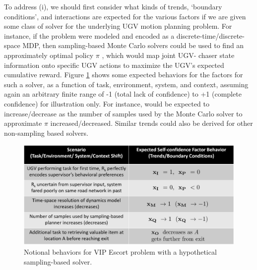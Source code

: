 To address (i), we should first consider what kinds of trends, `boundary conditions', and interactions are expected for the various factors if we are given some class of solver for the underlying UGV motion planning problem. For instance, if the problem were modeled and encoded as a discrete-time/discrete-space MDP, then sampling-based Monte Carlo solvers could be used to find an approximately optimal policy $\pi$ \cite{Browne2012-lj}, which would map joint UGV- chaser state information onto specific UGV actions to maximize the UGV's expected cumulative reward. Figure \ref{fig:trendsBCs} shows some expected behaviors for the \famsec{} factors for such a solver, as a function of task, environment, system, and context, assuming again an arbitrary finite range of -1 (total lack of confidence) to +1 (complete confidence) for illustration only. For instance, \xQ{} would be expected to increase/decrease as the number of samples used by the Monte Carlo solver to approximate $\pi$ increased/decreased. Similar trends could also be derived for other non-sampling based solvers.  %
\begin{figure}[tbp]
    \centering
    \includegraphics[width=0.8\linewidth]{Figures/scTrendsBoundaryExample.png}
    \caption{Notional \famsec{} behaviors for VIP Escort problem with a hypothetical sampling-based solver.}
    \label{fig:trendsBCs}
\end{figure}

